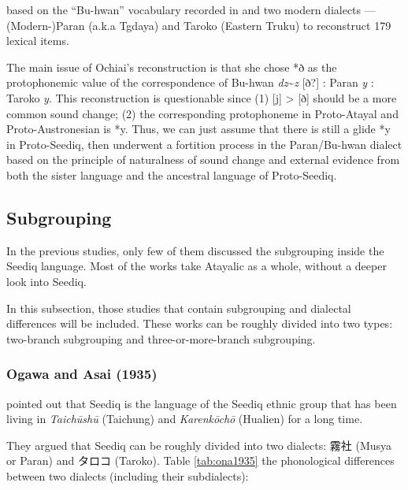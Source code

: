 \documentclass[12pt]{article}
\newcommand{\panf}{Proto-Austronesian\xspace}
\newcommand{\psedf}{Proto-Seediq\xspace}
\begin{document}
\textcite{ochiai2016buhwan} based on the ``Bu-hwan'' vocabulary recorded in \textcite{bullock1874formosan} and two modern dialects --- (Modern-)Paran (a.k.a Tgdaya) and Taroko (Eastern Truku) to reconstruct 179 lexical items. 

The main issue of Ochiai's reconstruction is that she chose *ð as the protophonemic value of the correspondence of Bu-hwan \textit{dz}\~{ }\textit{z} [ð?] : Paran \textit{y} : Taroko \textit{y}. This reconstruction is questionable since (1) [j] > [ð] should be a more common sound change; (2) the corresponding protophoneme in Proto-Atayal and \panf is *y. Thus, we can just assume that there is still a glide *y in \psedf, then underwent a fortition process in the Paran/Bu-hwan dialect based on the principle of naturalness of sound change and external evidence from both the sister language and the ancestral language of \psedf. 

\subsection{Subgrouping}

In the previous studies, only few of them discussed the subgrouping inside the Seediq language. Most of the works take Atayalic as a whole, without a deeper look into Seediq. 

In this subsection, those studies that contain subgrouping and dialectal differences will be included. These works can be roughly divided into two types: two-branch subgrouping and three-or-more-branch subgrouping. 

\subsubsection{Ogawa and Asai (1935)}

\textcite{ogawaandasai1935} pointed out that Seediq is the language of the Seediq ethnic group that has been living in \textit{Taichūshū} (Taichung) and \textit{Karenkōchō} (Hualien) for a long time.

They argued that Seediq can be roughly divided into two dialects: 霧社 (Musya or Paran) and タロコ (Taroko). Table \ref{tab:ona1935} the phonological differences between two dialects (including their subdialects):
\end{document}
